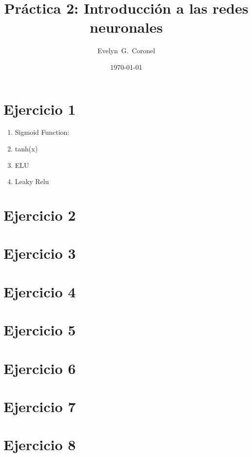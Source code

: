 


\title{Práctica 2: Introducción a las redes neuronales}
\author{Evelyn~G.~Coronel}


\date[]{\lowercase{\today}} %

\maketitle


\section*{Ejercicio 1}

\begin{enumerate}[label=(\alph*)]
    \item Sigmoid Function:
    \item tanh(x)
    \item ELU
    \item Leaky Relu
\end{enumerate}

\section*{Ejercicio 2}


\section*{Ejercicio 3}

\section*{Ejercicio 4}

\section*{Ejercicio 5}

\section*{Ejercicio 6}

\section*{Ejercicio 7}

\section*{Ejercicio 8}

